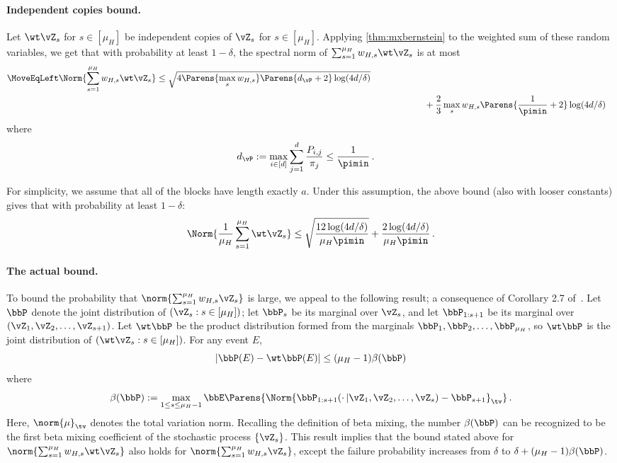 \paragraph{Independent copies bound.}
Let $\wt\vZ_s$ for $s \in [\mu_H]$ be independent copies of
$\vZ_s$ for $s \in [\mu_H]$.
Applying \cref{thm:mxbernstein} to the weighted sum of these random variables, we  get that 
with probability at least $1-\delta$, the spectral norm of
$\sum_{s=1}^{\mu_H} w_{H,s} \wt\vZ_s$ is at most
\begin{align*}
\MoveEqLeft  \Norm{\sum_{s=1}^{\mu_H} w_{H,s} \wt\vZ_s}
  \leq
  \sqrt{
    4\Parens{ \max_s w_{H,s} } \Parens{
      d_{\vP}
      + 2
    }
    \log(4d/\delta)
  }
  \\
& \qquad\qquad\qquad  +
  \frac23 \max_s w_{H,s}
  \Parens{
    \frac1{\pimin} + 2
  }
  \log(4d/\delta)
\end{align*}
where
\begin{align*}
  d_{\vP}
  & := \max_{i \in [d]} \sum_{j=1}^d \frac{P_{i,j}}{\pi_j}
  \leq
  \frac{1}{\pimin}
  \,.
\end{align*}

For simplicity, we assume that all of the blocks have length exactly $a$.
Under this assumption, 
the above bound (also with looser constants) gives that
with probability at least $1-\delta$:
\begin{equation}
\label{eq:indbound}
  \Norm{\frac1{\mu_H} \sum_{s=1}^{\mu_H} \wt\vZ_s}
  \leq
  \sqrt{
    \frac{12\log(4d/\delta)}{\mu_H\pimin}
  }
  +
  \frac{2\log(4d/\delta)}{\mu_H\pimin}
  \,.
\end{equation}

\paragraph{The actual bound.}
To bound the probability that $\norm{\sum_{s=1}^{\mu_H} w_{H,s}
\vZ_s}$ is large, we appeal to the following result; a consequence of
Corollary 2.7 of~\citet{Yu94}.
Let $\bbP$ denote the joint distribution of $(\vZ_s : s \in [\mu_H])$;
let $\bbP_s$ be its marginal over $\vZ_s$, and let $\bbP_{1:s+1}$ be
its marginal over $(\vZ_1,\vZ_2,\dotsc,\vZ_{s+1})$.
Let $\wt\bbP$ be the product distribution formed from the marginals
$\bbP_1,\bbP_2,\dotsc,\bbP_{\mu_H}$, so $\wt\bbP$ is the joint
distribution of $(\wt\vZ_s : s \in [\mu_H])$.
For any event $E$,
\[
  |\bbP(E) - \wt\bbP(E)| \leq (\mu_H-1) \beta(\bbP)
\]
where
\[
  \beta(\bbP)
  := \max_{1 \leq s \leq \mu_H-1}
  \bbE\Parens{
    \Norm{
      \bbP_{1:s+1}(\cdot\,|\vZ_1,\vZ_2,\dotsc,\vZ_s) - \bbP_{s+1}
    }_{\tv}
  }
  \,.
\]
Here, $\norm{\mu}_{\tv}$ denotes the total variation norm.
Recalling the definition of beta mixing,
the number $\beta(\bbP)$ can be recognized to be the first beta mixing coefficient of the stochastic process $\{\vZ_s\}$.
This result implies that the bound stated above for
$\norm{\sum_{s=1}^{\mu_H} w_{H,s} \wt\vZ_s}$ also holds for
$\norm{\sum_{s=1}^{\mu_H} w_{H,s} \vZ_s}$, except the failure
probability increases from $\delta$ to $\delta +
(\mu_H-1)\beta(\bbP)$.

